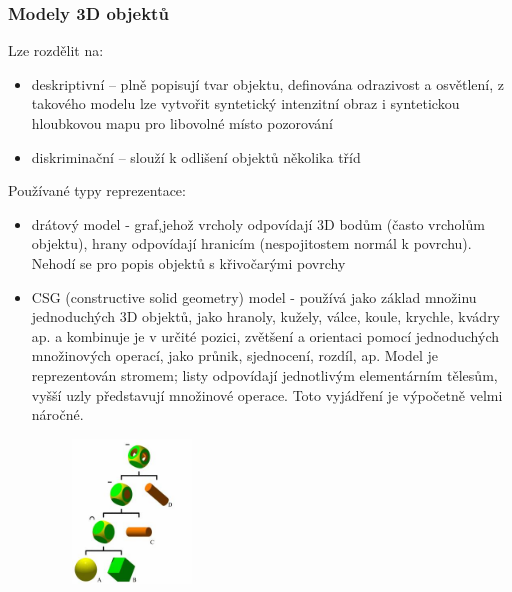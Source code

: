 \begin{frame}
\frametitle{Modely 3D objektů}
Lze rozdělit na:
\begin{itemize}
	\item deskriptivní – plně popisují tvar objektu, definována odrazivost a osvětlení, z takového modelu lze vytvořit syntetický intenzitní obraz i syntetickou hloubkovou mapu pro libovolné místo pozorování
	\item diskriminační – slouží k odlišení objektů několika tříd
\end{itemize}

Používané typy reprezentace:
\begin{itemize}
	\item drátový model - graf,jehož  vrcholy  odpovídají  3D  bodům  (často  vrcholům  objektu),  hrany  odpovídají  hranicím (nespojitostem normál k povrchu). Nehodí se pro popis objektů s křivočarými povrchy
\end{itemize}

\end{frame}

\begin{frame}
\begin{itemize}
	\item CSG (constructive solid geometry) model - používá  jako  základ  množinu  jednoduchých  3D  objektů,  jako  hranoly,  kužely,  válce,  koule,  krychle, kvádry  ap.  a  kombinuje  je  v  určité  pozici,  zvětšení  a  orientaci  pomocí  jednoduchých  množinových operací,  jako  průnik,  sjednocení,  rozdíl,  ap.  Model  je  reprezentován  stromem;  listy  odpovídají jednotlivým  elementárním  tělesům,  vyšší  uzly  představují  množinové  operace.  Toto  vyjádření  je výpočetně velmi náročné.
	\begin{figure}[!ht]
	\centering
	\includegraphics[width = 0.3\textwidth]{./csgtree}
	\end{figure}
\end{itemize}
\end{frame}

